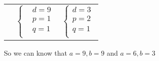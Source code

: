 \documentclass{article}
\theoremstyle{definition}
\theoremstyle{plain}
\begin{document}
\begin {enumerate}[itemindent=30pt,label=\bf Exercise {\arabic*}:]
\begin{tabularx}{300pt}{XXX}
\qquad &
\begin{equation*}
  \left\{
   \begin{aligned}
   &d = 9  \\
   &p = 1  \\
   &q = 1  \\
   \end{aligned}
  \right.
\end{equation*} &
  \begin{equation*}
  \left\{
   \begin{aligned}
   	d = 3\\
    p = 2\\
    q = 1\\
   \end{aligned}
  \right.
\end{equation*}
\end{tabularx}
\subitem So we can know that $a = 9, b = 9$ and $a = 6 , b = 3$
\end{enumerate}
\end{document}
